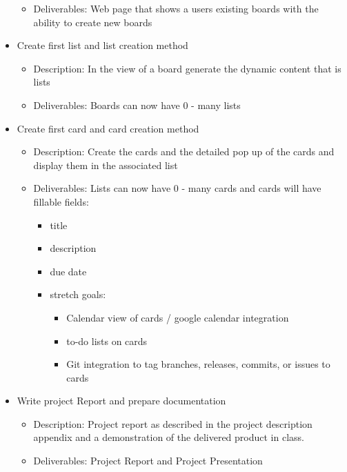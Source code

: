 \documentclass[letterpaper]{article}
\begin{document}
\begin{itemize}
\begin{itemize}
    \item Deliverables: Web page that shows a users existing boards with the ability to create new boards
  \end{itemize}
  \item Create first list and list creation method
  \begin{itemize}
    \item Description: In the view of a board generate the dynamic content that is lists
    \item Deliverables: Boards can now have 0 - many lists
  \end{itemize}
  \item Create first card and card creation method
  \begin{itemize}
    \item Description: Create the cards and the detailed pop up of the cards and display them in the associated list
    \item Deliverables: Lists can now have 0 - many cards and cards will have fillable fields:
      \begin{itemize}
        \item title
        \item description
        \item due date
        \item stretch goals:
        \begin{itemize}
          \item Calendar view of cards / google calendar integration
          \item to-do lists on cards
          \item Git integration to tag branches, releases, commits, or issues to cards
        \end{itemize}
      \end{itemize}
  \end{itemize}
  \item Write project Report and prepare documentation
    \begin{itemize}
      \item Description: Project report as described in the project description appendix and a demonstration of the delivered product in class.
      \item  Deliverables: Project Report and Project Presentation
    \end{itemize}
\end{itemize}
\end{document}
